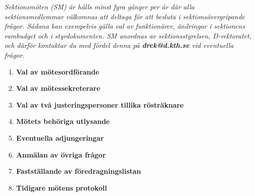 \documentclass{dagordning}
\begin{document}
{\small \textit{Sektionsmöten (SM) är hålls minst fyra gånger per år där alla sektionsmedlemmar välkomnas att deltaga för att besluta i sektionsövergripande frågor. Sådana kan exempelvis gälla val av funktionärer, ändringar i sektionens rambudget och i styrdokumenten. SM anordnas av sektionsstyrelsen, D-rektoratet, och därför kontaktar du med fördel denna på \textbf{\textit{drek@d.kth.se}} vid eventuella frågor.}}\\





  \begin{enumerate}
    \item\textbf{Val av mötesordförande}
    \item\textbf{Val av mötessekreterare}
    \item\textbf{Val av två justeringspersoner tillika rösträknare}
    \item\textbf{Mötets behöriga utlysande}
    \item\textbf{Eventuella adjungeringar}
    \item\textbf{Anmälan av övriga frågor}
    \item\textbf{Fastställande av föredragningslistan}
    \item\textbf{Tidigare mötens protokoll}
  \end{enumerate}
\end{document}
